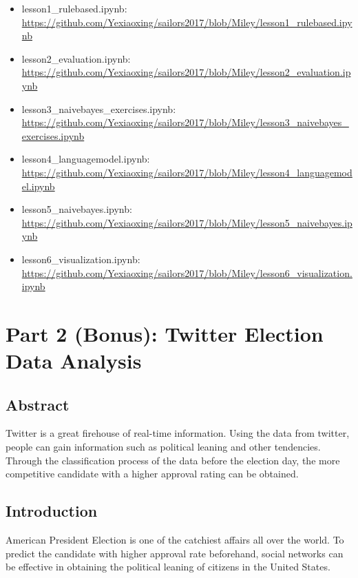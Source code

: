\documentclass[12pt,a4paper]{report}
\begin{document}
  \begin{itemize}
    \item
          lesson1\_rulebased.ipynb:
          \url{https://github.com/Yexiaoxing/sailors2017/blob/Miley/lesson1_rulebased.ipynb}
    \item
          lesson2\_evaluation.ipynb:
          \url{https://github.com/Yexiaoxing/sailors2017/blob/Miley/lesson2_evaluation.ipynb}
    \item
          lesson3\_naivebayes\_exercises.ipynb:
          \url{https://github.com/Yexiaoxing/sailors2017/blob/Miley/lesson3_naivebayes_exercises.ipynb}
    \item
          lesson4\_languagemodel.ipynb:
          \url{https://github.com/Yexiaoxing/sailors2017/blob/Miley/lesson4_languagemodel.ipynb}
    \item
          lesson5\_naivebayes.ipynb:
          \url{https://github.com/Yexiaoxing/sailors2017/blob/Miley/lesson5_naivebayes.ipynb}
    \item
          lesson6\_visualization.ipynb:
          \url{https://github.com/Yexiaoxing/sailors2017/blob/Miley/lesson6_visualization.ipynb}
  \end{itemize}


\chapter{Part 2 (Bonus): Twitter Election Data Analysis}
  \section{Abstract}

    Twitter is a great firehouse of real-time information. Using the data from twitter, people can gain information such as political leaning and other tendencies. Through the classification process of the data before the election day, the more competitive candidate with a higher approval rating can be obtained.

  \section{Introduction}

    American President Election is one of the catchiest affairs all over the world. To predict the candidate with higher approval rate beforehand, social networks can be effective in obtaining the political leaning of citizens in the United States.
\end{document}
